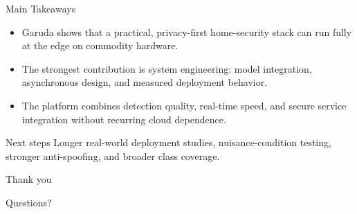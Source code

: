 \documentclass[aspectratio=169]{beamer}
\begin{document}
\begin{frame}{Main Takeaways}
  \begin{itemize}
    \item Garuda shows that a practical, privacy-first home-security stack can run fully at the edge on commodity hardware.
    \item The strongest contribution is system engineering: model integration, asynchronous design, and measured deployment behavior.
    \item The platform combines detection quality, real-time speed, and secure service integration without recurring cloud dependence.
  \end{itemize}
  \vspace{0.3cm}
  \begin{block}{Next steps}
    Longer real-world deployment studies, nuisance-condition testing, stronger anti-spoofing, and broader class coverage.
  \end{block}
\end{frame}

\begin{frame}
  \centering
  \Large Thank you
  
  \vspace{0.4cm}
  \normalsize Questions?
\end{frame}
\end{document}
